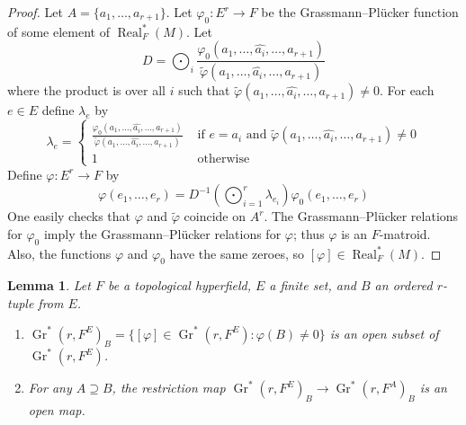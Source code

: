 \documentclass[10pt, preprint]{article}
\newtheorem{lemma}[theorem]{Lemma}
\theoremstyle{definition}
\begin{document}
\begin{proof}
Let $A = \{a_{1}, \dots , a_{r+1}\}$. Let $\varphi _{0}: E^{r}\to F$ be
the Grassmann--Pl\"{u}cker function of some element of $
\operatorname{Real}_{F}^{*}(M)$. Let
%
\begin{equation*}
D=\bigodot _{i}\frac{ \varphi _{0}(a_{1},\ldots , \widehat{a_{i}},
\ldots , a_{r+1})}{\tilde{\varphi }(a_{1},\ldots , \widehat{a_{i}},
\ldots , a_{r+1})}
\end{equation*}
%
where the product is over all $i$ such that $\tilde{\varphi }(a_{1},
\ldots , \widehat{a_{i}},\ldots , a_{r+1})\neq 0$. For each
$e\in E$ define $\lambda _{e}$ by
%
\begin{equation*}
\lambda _{e}=
%
\begin{cases}
\frac{ \varphi _{0}(a_{1},\ldots , \widehat{a_{i}},\ldots , a_{r+1})}{
\tilde{\varphi }(a_{1},\ldots , \widehat{a_{i}},\ldots , a_{r+1})}
&
\text{ if $e=a_{i}$ and $\tilde{\varphi }(a_{1},\ldots , \widehat{a_{i}},\ldots , a_{r+1})\neq 0$}
\\
1
&\mbox{ otherwise}
\end{cases}
%
\end{equation*}
%
Define $\varphi : E^{r}\to F$ by
%
\begin{equation*}
\varphi (e_{1}, \ldots , e_{r})=D^{-1}(\bigodot _{i=1}^{r} \lambda _{e
_{i}})\varphi _{0}(e_{1}, \ldots , e_{r})
\end{equation*}
%
One easily checks that $\varphi $ and $\tilde{\varphi }$ coincide on
$A^{r}$. The Grassmann--Pl\"{u}cker relations for $\varphi _{0}$ imply the
Grassmann--Pl\"{u}cker relations for $\varphi $; thus $\varphi $ is an
$F$-matroid. Also, the functions $\varphi $ and $\varphi _{0}$ have the
same zeroes, so $[\varphi ]\in \operatorname{Real}_{F}^{*}(M)$.
\end{proof}

\begin{lemma}
\label{lem:open}
Let $F$ be a topological hyperfield, $E$ a finite set, and $B$ an
ordered $r$-tuple from $E$.
%
\begin{enumerate}[\textit{2.}]%
\item[\textit{1.}]
$\operatorname{Gr}^{*}(r, F^{E})_{B} =\{ [\varphi ] \in
\operatorname{Gr}^{*}(r,F^{E}) : \varphi (B) \neq 0\}$ is an open
subset of $\operatorname{Gr}^{*}(r, F^{E})$.
%
\item[\textit{2.}]
For any $A\supseteq B$, the restriction map $\operatorname{Gr}^{*}(r,
F^{E})_{B}\to \operatorname{Gr}^{*}(r, F^{A})_{B}$ is an open map.
\end{enumerate}
%
\end{lemma}
\end{document}
